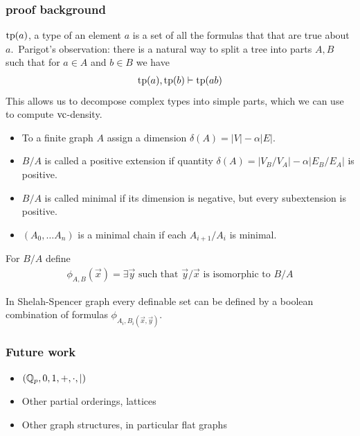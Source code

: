\documentclass{beamer}
\begin{document}
\begin{frame}
	\frametitle{proof background}
	$\operatorname{tp}(a)$, a type of an element $a$ is a set of all the formulas that that are true about $a$.\
	Parigot's observation: there is a natural way to split a tree into parts $A, B$ such that for $a \in A$ and $b \in B$ we have
	\begin{align*}
		\operatorname{tp}(a), \operatorname{tp}(b) \vdash \operatorname{tp}(ab)
	\end{align*}
	This allows us to decompose complex types into simple parts, which we can use to compute $\operatorname{vc}$-density.
\end{frame}

\begin{frame}
\begin{Definition}
	\begin{itemize}
		\item To a finite graph $A$ assign a dimension $\delta(A) = |V| - \alpha |E|$.
		\item $B/A$ is called a positive extension if quantity $\delta(A) = |V_B/V_A| - \alpha |E_B/E_A|$ is positive.
		\item $B/A$ is called minimal if its dimension is negative, but every subextension is positive.
		\item $(A_0, \ldots A_n)$ is a minimal chain if each $A_{i + 1}/A_i$ is minimal.
	\end{itemize}
\end{Definition}
	For $B/A$ define
	\begin{align*}
		\phi_{A,B}(\vec x) = \exists \vec y \text { such that $\vec y/\vec x$ is isomorphic to $B/A$}
	\end{align*}
	\begin{Theorem} 
		In Shelah-Spencer graph every definable set can be defined by a boolean combination of formulas $\phi_{A_i, B_i(\vec x, \vec y)}$.
	\end{Theorem}
\end{frame}

\begin{frame}
	\frametitle{Future work}
	\begin{itemize}
		\item $(\mathbb{Q}_p, 0, 1, +, \cdot, \mid)$
		\item Other partial orderings, lattices
		\item Other graph structures, in particular flat graphs
	\end{itemize}
\end{frame}
\end{document}
